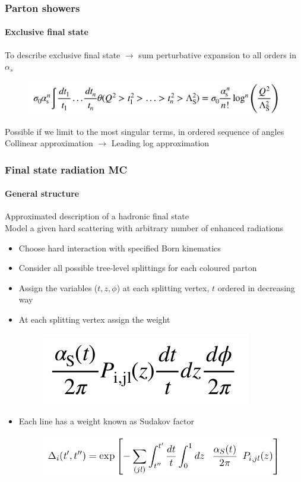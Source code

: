 \documentclass[aspectratio=43]{beamer}
\begin{document}
\begin{frame}
	
	\frametitle{Parton showers}
	\framesubtitle{Exclusive final state}
	
	\footnotesize To describe exclusive final state $\rightarrow$ sum perturbative expansion to all orders in $\alpha_s$ \\
	
	\begin{figure}
		\includegraphics[width = 9 cm]{plots/exclusive_ll.png}
	\end{figure}
	
	\footnotesize Possible if we limit to the most singular terms, in ordered sequence of angles \\
	\color{red} Collinear approximation $\longrightarrow$ Leading log approximation

\end{frame}

\begin{frame}

	\frametitle{Final state radiation MC}
	\framesubtitle{General structure}
	
	\footnotesize Approximated description of a hadronic final state \\
	\footnotesize Model a given hard scattering with arbitrary number of enhanced radiations

	\begin{itemize} 
		\item Choose hard interaction with specified Born kinematics
		\item Consider all possible tree-level splittings for each coloured parton
		\item Assign the variables ($t, z, \phi$) at each splitting vertex, $t$ ordered in decreasing way
		\item At each splitting vertex assign the weight 
		\begin{figure}
			\includegraphics[width = 2.5 cm]{plots/AP_weight.png}
		\end{figure}
		\item Each line has a weight known as Sudakov factor
		\begin{figure}
			\includegraphics[width = 7 cm]{plots/sudakov.png}
		\end{figure}
	\end{itemize}

\end{frame}
\end{document}
